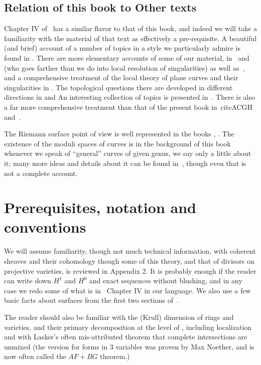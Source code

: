 \subsection{Relation of this book to Other texts} 
Chapter IV of~\cite{Hartshorne1977} has a similar flavor to that of this book, and indeed we will take a familiarity with the material of that text as effectively a pre-requisite. A beautiful (and brief) account of a number of topics in a style we particularly admire is found in \cite{MumfordCJ}.
There are more elementary accounts of some of our material, in~\cite{Fulton1989} and \cite{Walker1978} (who goes farther than we do into local resolution of singularities) as well as~\cite{Griffiths-curves}, and a comprehensive treatment of the local theory of plane curves and their singularities in \cite{Brieskorn1986}. The topological questions there are developed in different directions in \cite{MR0239612} %
 and \cite{MR817982}%
 An interesting collection of topics is presented in~\cite{Clemens-Scrapbook}.
There is also a far more comprehensive treatment than that of the present book in~cite{ACGH} and~\cite{ACGH-2}.

 The Riemann surface point of view is well represented in the books \cite{Forster} \cite{Gunning}, \cite{Gunning-2} \cite{Kirwan}\cite{Miranda}. The existence of the moduli spaces of curves is in the background of this book whenever we speak of ``general'' curves of given genus, we say only a little about it; many more ideas and details about it can be found in~\cite{HarrisMorrison1998}, though even that is not a complete account.


\section{Prerequisites, notation and conventions}

We will assume familiarity, though not much technical information, with coherent sheaves and their cohomology though some of this theory, and that of divisors on projective 
varieties, is reviewed in Appendix 2. It is probably enough if the reader can write down $H^1$ and $H^0$ and exact sequences without blushing, and in any case we redo some of what is in~\cite[Chapter IV]{Hartshorne1977}  Chapter IV in our language. We also use a few basic facts about surfaces from the first two sections of~\cite[Chapter IV]{Hartshorne1977}.

The reader should also be familiar with the (Krull) dimension of rings and varieties, and their primary decomposition at the level of \cite{Atiyah-MacDonald}, including localization and with Lasker's often mis-attributed theorem that complete intersections are unmixed (the version for forms in 3 variables was proven by
Max Noether, and is now often called the $AF+BG$ theorem.)




